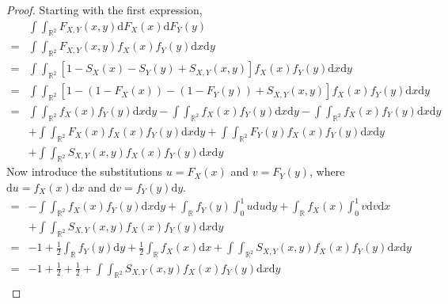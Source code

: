 \begin{proof}
    Starting with the first expression,
    \begin{align*}
        &\int\int_{\mathbb{R}^2}F_{X,Y}\left(x,y\right)\mathrm{d}F_X\left(x\right)\mathrm{d}F_Y\left(y\right)\\
        =&\int\int_{\mathbb{R}^2}F_{X,Y}\left(x,y\right)f_X\left(x\right)f_Y\left(y\right)\mathrm{d}x\mathrm{d}y\\
        =&\int\int_{\mathbb{R}^2}\left[1-S_X\left(x\right)-S_Y\left(y\right)+S_{X,Y}\left(x,y\right)\right]f_X\left(x\right)f_Y\left(y\right)\mathrm{d}x\mathrm{d}y\\
        =&\int\int_{\mathbb{R}^2}\left[1-\left(1-F_X\left(x\right)\right)-\left(1-F_Y\left(y\right)\right)+S_{X,Y}\left(x,y\right)\right]f_X\left(x\right)f_Y\left(y\right)\mathrm{d}x\mathrm{d}y\\
        =&\int\int_{\mathbb{R}^2}f_X\left(x\right)f_Y\left(y\right)\mathrm{d}x\mathrm{d}y-\int\int_{\mathbb{R}^2}f_X\left(x\right)f_Y\left(y\right)\mathrm{d}x\mathrm{d}y-\int\int_{\mathbb{R}^2}f_X\left(x\right)f_Y\left(y\right)\mathrm{d}x\mathrm{d}y\\
        &+\int\int_{\mathbb{R}^2}F_X\left(x\right)f_X\left(x\right)f_Y\left(y\right)\mathrm{d}x\mathrm{d}y+\int\int_{\mathbb{R}^2}F_Y\left(y\right)f_X\left(x\right)f_Y\left(y\right)\mathrm{d}x\mathrm{d}y\\
        &+\int\int_{\mathbb{R}^2}S_{X,Y}\left(x,y\right)f_X\left(x\right)f_Y\left(y\right)\mathrm{d}x\mathrm{d}y
    \end{align*}
    Now introduce the substitutions $u=F_X\left(x\right)$ and $v=F_Y\left(y\right)$, where $\mathrm{d}u=f_X\left(x\right)\mathrm{d}x$ and $\mathrm{d}v=f_Y\left(y\right)\mathrm{d}y$.
    \begin{align*}
        =&-\int\int_{\mathbb{R}^2}f_X\left(x\right)f_Y\left(y\right)\mathrm{d}x\mathrm{d}y+\int_{\mathbb{R}}f_Y\left(y\right)\int_0^1u\mathrm{d}u\mathrm{d}y+\int_{\mathbb{R}}f_X\left(x\right)\int_0^1v\mathrm{d}v\mathrm{d}x\\
        &+\int\int_{\mathbb{R}^2}S_{X,Y}\left(x,y\right)f_X\left(x\right)f_Y\left(y\right)\mathrm{d}x\mathrm{d}y\\
        =&-1+\frac{1}{2}\int_{\mathbb{R}}f_Y\left(y\right)\mathrm{d}y+\frac{1}{2}\int_{\mathbb{R}}f_X\left(x\right)\mathrm{d}x+\int\int_{\mathbb{R}^2}S_{X,Y}\left(x,y\right)f_X\left(x\right)f_Y\left(y\right)\mathrm{d}x\mathrm{d}y\\
        =&-1+\frac{1}{2}+\frac{1}{2}+\int\int_{\mathbb{R}^2}S_{X,Y}\left(x,y\right)f_X\left(x\right)f_Y\left(y\right)\mathrm{d}x\mathrm{d}y\\

\end{align*}
\end{proof}
